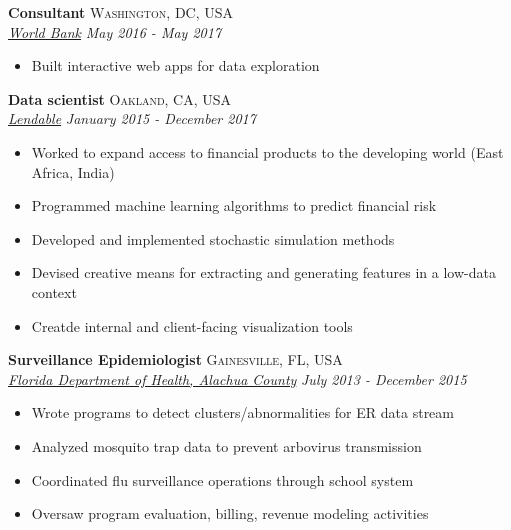 \documentclass[11pt]{article}
\begin{document}
{\noindent \textbf{Consultant} \hfill \textsc{Washington, DC, USA}\\
\noindent \emph{\href{http://www.worldbank.org/}{World Bank}} \hfill \emph{May 2016 - May 2017}
\vspace{-2mm}
\begin{itemize}\itemsep0pt \parskip0pt 
\item Built interactive web apps for data exploration
\end{itemize}

\noindent \textbf{Data scientist} \hfill \textsc{Oakland, CA, USA}\\
\noindent \emph{\href{http://lendable.io}{Lendable}} \hfill \emph{January 2015 - December 2017}
\vspace{-2mm}
\begin{itemize}\itemsep0pt \parskip0pt 
\item Worked to expand access to financial products to the developing world (East Africa, India)
\item Programmed machine learning algorithms to predict financial risk
\item Developed and implemented stochastic simulation methods 
\item Devised creative means for extracting and generating features in a low-data context 
\item Creatde internal and client-facing visualization tools
\end{itemize}


\noindent \textbf{Surveillance Epidemiologist} \hfill \textsc{Gainesville, FL, USA}\\
\noindent \emph{\href{http://alachua.floridahealth.gov/}{Florida Department of Health, Alachua County}} \hfill \emph{July 2013 - December 2015}
\vspace{-2mm}
\begin{itemize}\itemsep0pt \parskip0pt 
\item Wrote programs to detect clusters/abnormalities for ER data stream
\item Analyzed mosquito trap data to prevent arbovirus transmission
\item Coordinated flu surveillance operations through school system
\item Oversaw program evaluation, billing, revenue modeling activities
\end{itemize}

}
\end{document}
